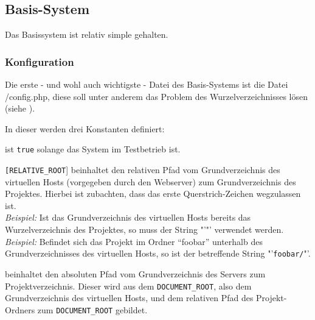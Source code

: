 \subsection{Basis-System}
Das Basissystem ist relativ simple gehalten.\\
\subsubsection{Konfiguration}
Die erste - und wohl auch wichtigste - Datei des Basis-Systems ist die Datei /config.php, diese soll unter anderem das Problem des Wurzelverzeichnisses lösen (siehe ).

In dieser werden drei Konstanten definiert:
\begin{description}
	\item[\texttt{BETA}] ist \texttt{true} solange das System im Testbetrieb ist.
	\item\texttt{[RELATIVE\_ROOT}] beinhaltet den relativen Pfad vom Grundverzeichnis des virtuellen Hosts (vorgegeben durch den Webserver) zum Grundverzeichnis des Projektes. Hierbei ist zubachten, dass das erste Querstrich-Zeichen wegzulassen ist.\\
	\textit{Beispiel:} Ist das Grundverzeichnis des virtuellen Hosts bereits das Wurzelverzeichnis des Projektes, so muss der String "'"' verwendet werden.\\
	\textit{Beispiel:} Befindet sich das Projekt im Ordner \enquote{foobar} unterhalb des Grundverzeichnisses des virtuellen Hosts, so ist der betreffende String "'\texttt{foobar/}"'.
	\item[\texttt{ROOT\_LOCATION}] beinhaltet den absoluten Pfad vom Grundverzeichnis des Servers zum Projektverzeichnis. Dieser wird aus dem \texttt{DOCUMENT\_ROOT}, also dem Grundverzeichnis des virtuellen Hosts, und dem relativen Pfad des Projekt-Ordners zum \texttt{DOCUMENT\_ROOT} gebildet.
\end{description}

